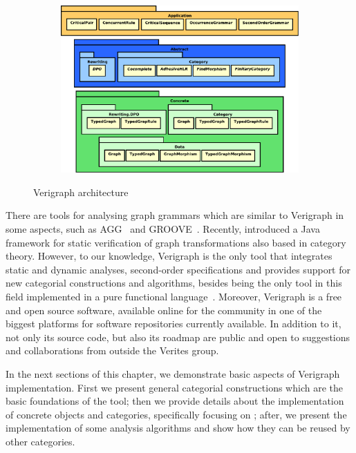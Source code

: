 \begin{figure}[!ht]
  \centering
  \begin{subfigure}[t]{.5\textwidth}
    \centerline{\includegraphics[scale=0.6]{images/verigraph/layers}}
  \end{subfigure}
  \caption{Verigraph architecture}\label{fig:verigraph:layers}
\end{figure}

There are tools for analysing graph grammars which are similar to Verigraph in some aspects, such as AGG~\cite{Taentzer2000} and GROOVE~\cite{Rensink2004}. Recently, \cite{Deckwerth2016} introduced a Java framework for static verification of graph transformations also based in category theory.
  However, to our knowledge, Verigraph is the only tool that integrates static and dynamic analyses, second-order specifications and provides support for new categorial constructions and algorithms, besides being the only tool in this field implemented in a pure functional language~\cite{Costa2016}.
  Moreover, Verigraph is a free and open source software, available online for the community in one of the biggest platforms for software repositories currently available. In addition to it, not only its source code, but also its roadmap are public and open to suggestions and collaborations from outside the Verites group.

In the next sections of this chapter, we demonstrate basic aspects of Verigraph implementation. First we present general categorial constructions which are the basic foundations of the tool; then we provide details about the implementation of concrete objects and categories, specifically focusing on \typedGraphCategory{}; after, we present the implementation of some analysis algorithms and show how they can be reused by other categories. %

